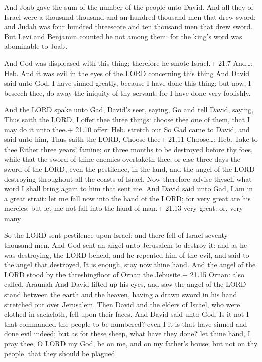  And Joab gave the sum of the number of the people unto
David. And all they of Israel were a thousand thousand and an hundred
thousand men that drew sword: and Judah was four hundred threescore and
ten thousand men that drew sword.  But Levi and Benjamin
counted he not among them: for the king's word was abominable to Joab.

 And God was displeased with this thing; therefore he smote
Israel.+ 21.7 And\ldots: Heb. And it was evil in the eyes of the LORD
concerning this thing  And David said unto God, I have
sinned greatly, because I have done this thing: but now, I beseech thee,
do away the iniquity of thy servant; for I have done very foolishly.

 And the LORD spake unto Gad, David's seer, saying,
 Go and tell David, saying, Thus saith the LORD, I offer
thee three things: choose thee one of them, that I may do it unto thee.+
21.10 offer: Heb. stretch out  So Gad came to David, and
said unto him, Thus saith the LORD, Choose thee+ 21.11 Choose\ldots:
Heb. Take to thee  Either three years' famine; or three
months to be destroyed before thy foes, while that the sword of thine
enemies overtaketh thee; or else three days the sword of the LORD, even
the pestilence, in the land, and the angel of the LORD destroying
throughout all the coasts of Israel. Now therefore advise thyself what
word I shall bring again to him that sent me.  And David
said unto Gad, I am in a great strait: let me fall now into the hand of
the LORD; for very great are his mercies: but let me not fall into the
hand of man.+ 21.13 very great: or, very many

 So the LORD sent pestilence upon Israel: and there fell
of Israel seventy thousand men.  And God sent an angel unto
Jerusalem to destroy it: and as he was destroying, the LORD beheld, and
he repented him of the evil, and said to the angel that destroyed, It is
enough, stay now thine hand. And the angel of the LORD stood by the
threshingfloor of Ornan the Jebusite.+ 21.15 Ornan: also called, Araunah
 And David lifted up his eyes, and saw the angel of the
LORD stand between the earth and the heaven, having a drawn sword in his
hand stretched out over Jerusalem. Then David and the elders of Israel,
who were clothed in sackcloth, fell upon their faces.  And
David said unto God, Is it not I that commanded the people to be
numbered? even I it is that have sinned and done evil indeed; but as for
these sheep, what have they done? let thine hand, I pray thee, O LORD my
God, be on me, and on my father's house; but not on thy people, that
they should be plagued.

